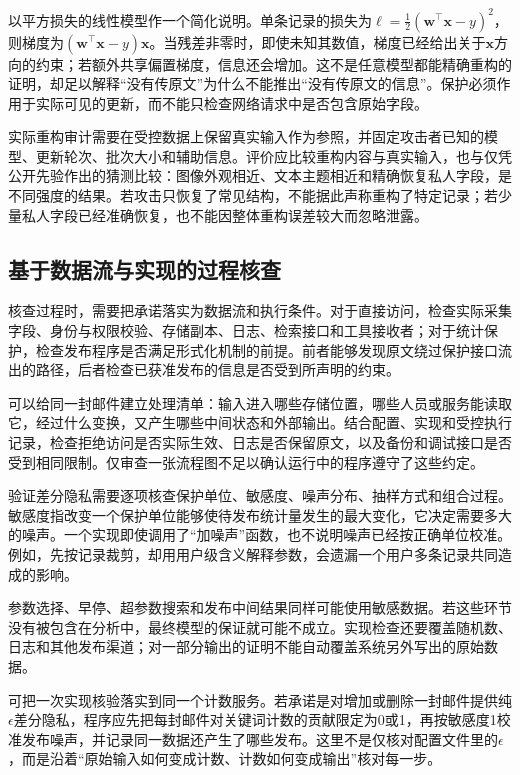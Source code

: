 以平方损失的线性模型作一个简化说明。单条记录的损失为$\ell=\tfrac12(\bm w^\top\bm x-y)^2$，则梯度为$(\bm w^\top\bm x-y)\bm x$。当残差非零时，即使未知其数值，梯度已经给出关于$\bm x$方向的约束；若额外共享偏置梯度，信息还会增加。这不是任意模型都能精确重构的证明，却足以解释“没有传原文”为什么不能推出“没有传原文的信息”。保护必须作用于实际可见的更新，而不能只检查网络请求中是否包含原始字段。

实际重构审计需要在受控数据上保留真实输入作为参照，并固定攻击者已知的模型、更新轮次、批次大小和辅助信息。评价应比较重构内容与真实输入，也与仅凭公开先验作出的猜测比较：图像外观相近、文本主题相近和精确恢复私人字段，是不同强度的结果。若攻击只恢复了常见结构，不能据此声称重构了特定记录；若少量私人字段已经准确恢复，也不能因整体重构误差较大而忽略泄露。

\subsection{基于数据流与实现的过程核查}
\label{sec:privacy-implementation-verification}

核查过程时，需要把承诺落实为数据流和执行条件。对于直接访问，检查实际采集字段、身份与权限校验、存储副本、日志、检索接口和工具接收者；对于统计保护，检查发布程序是否满足形式化机制的前提。前者能够发现原文绕过保护接口流出的路径，后者检查已获准发布的信息是否受到所声明的约束。

可以给同一封邮件建立处理清单：输入进入哪些存储位置，哪些人员或服务能读取它，经过什么变换，又产生哪些中间状态和外部输出。结合配置、实现和受控执行记录，检查拒绝访问是否实际生效、日志是否保留原文，以及备份和调试接口是否受到相同限制。仅审查一张流程图不足以确认运行中的程序遵守了这些约定。

验证差分隐私需要逐项核查保护单位、敏感度、噪声分布、抽样方式和组合过程。敏感度指改变一个保护单位能够使待发布统计量发生的最大变化，它决定需要多大的噪声。一个实现即使调用了“加噪声”函数，也不说明噪声已经按正确单位校准。例如，先按记录裁剪，却用用户级含义解释参数，会遗漏一个用户多条记录共同造成的影响。

参数选择、早停、超参数搜索和发布中间结果同样可能使用敏感数据。若这些环节没有被包含在分析中，最终模型的保证就可能不成立。实现检查还要覆盖随机数、日志和其他发布渠道；对一部分输出的证明不能自动覆盖系统另外写出的原始数据。

可把一次实现核验落实到同一个计数服务。若承诺是对增加或删除一封邮件提供纯$\epsilon$差分隐私，程序应先把每封邮件对关键词计数的贡献限定为0或1，再按敏感度1校准发布噪声，并记录同一数据还产生了哪些发布。这里不是仅核对配置文件里的$\epsilon$，而是沿着“原始输入如何变成计数、计数如何变成输出”核对每一步。

